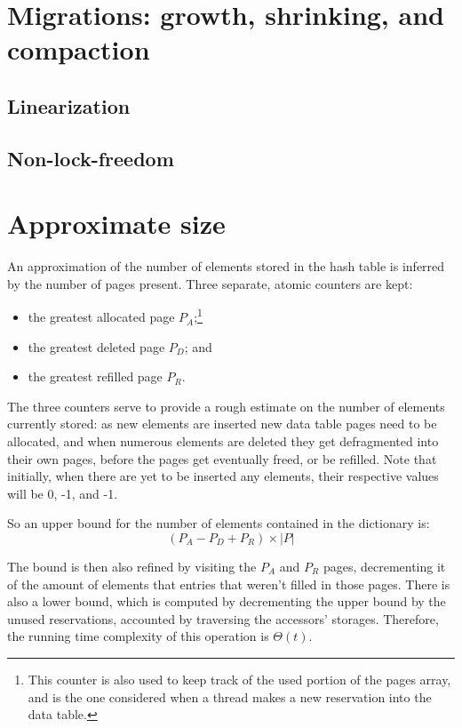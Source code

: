 \section{Migrations: growth, shrinking, and compaction}\label{sec:migrations}




\subsection{Linearization}\label{subsec:migration-linearization}

\subsection{Non-lock-freedom}\label{subsec:migration-lock-freedom}


\section{Approximate size}\label{sec:approximate-size}

An approximation of the number of elements stored in the hash table is inferred by the number of pages present.
Three separate, atomic counters are kept:

\begin{itemize}
	\item the greatest allocated page $P_A$;\footnote{%
		This counter is also used to keep track of the used portion of the pages array, and is the one considered when a thread makes a new reservation into the data table.
	}
	\item the greatest deleted page $P_D$; and
	\item the greatest refilled page $P_R$.
\end{itemize}

The three counters serve to provide a rough estimate on the number of elements currently stored: as new elements are inserted new data table pages need to be allocated, and when numerous elements are deleted they get defragmented into their own pages, before the pages get eventually freed, or be refilled.
Note that initially, when there are yet to be inserted any elements, their respective values will be 0, -1, and -1.

So an upper bound for the number of elements contained in the dictionary is:
\[
(P_A - P_D + P_R) \times |P|
\]

The bound is then also refined by visiting the $P_A$ and $P_R$ pages, decrementing it of the amount of elements that entries that weren't filled in those pages.
There is also a lower bound, which is computed by decrementing the upper bound by the unused reservations, accounted by traversing the accessors' storages.
Therefore, the running time complexity of this operation is $\Theta(t)$.

